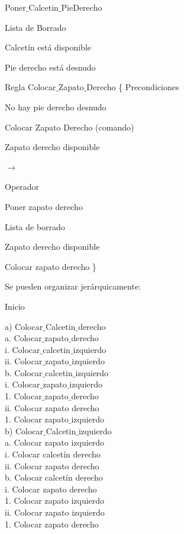 Poner$\_$Calcetin$\_$PieDerecho

Lista de Borrado

Calcetín está disponible

Pie derecho está desnudo


Regla Colocar$\_$Zapato$\_$Derecho \{
	Precondiciones
	
	No hay pie derecho desnudo
	
	Colocar Zapato Derecho (comando)
	
	Zapato derecho disponible
	
	$\rightarrow$
	
	Operador
	
	Poner zapato derecho
	
	Lista de borrado
	
	Zapato derecho disponible
	
	Colocar zapato derecho
\}



Se pueden organizar jerárquicamente:

Inicio

a) Colocar$\_$Calcetin$\_$derecho \\
a. Colocar$\_$zapato$\_$derecho \\
i. Colocar$\_$calcetin$\_$izquierdo \\
ii. Colocar$\_$zapato$\_$izquierdo \\

b. Colocar$\_$calcetin$\_$izquierdo \\
i. Colocar$\_$zapato$\_$izquierdo \\
1. Colocar$\_$zapato$\_$derecho \\
ii. Colocar zapato derecho \\
1. Colocar zapato$\_$izquierdo \\

b) Colocar$\_$Calcetin$\_$izquierdo\\
a. Colocar zapato izquierdo\\
i. Colocar calcetín derecho\\
ii. Colocar zapato derecho\\

b. Colocar calcetín derecho\\
i. Colocar zapato derecho\\
1. Colocar zapato izquierdo\\
ii. Colocar zapato izquierdo\\

1. Colocar zapato derecho\\


